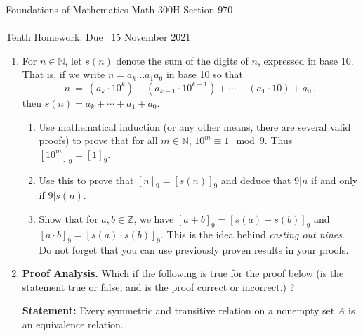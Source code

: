 \documentclass[12pt]{article}
\newcommand{\NN}{{\mathbb N}}  %
\newcommand{\ZZ}{{\mathbb Z}}  %
\newcommand{\demph}[1]{{\color{blue}\sl{#1}}}
\begin{document}
\LARGE 
\noindent
{\color{Maroon}Foundations of Mathematics \hfill Math 300H Section 970}\vspace{2pt}\\
\Large \vspace{2pt}\\
\large
Tenth Homework: \hfill Due \  15 November 2021
\normalsize\medskip


\noindent{\color{blue}\rule{528.3675pt}{2pt}}


\begin{enumerate}  %

   
\item For $n\in \NN$, let $s(n)$ denote the sum of the digits of $n$, expressed in base 10.
  That is, if we write $n=a_k\dotsc a_1 a_0$ in base 10 so that
  \[
     n\ =\ \left(a_k\cdot 10^k\right) +   \left(a_{k-1}\cdot 10^{k-1}\right) +\dotsb + 
     \left(a_1\cdot 10\right) + a_0\,,
  \]
  then $s(n)=a_k+\dotsb+a_1+a_0$.
   \begin{enumerate}
     \item Use mathematical induction (or any other means, there are several valid proofs) to prove that for all $m\in\NN$, $10^m\equiv 1\mod 9$.
     Thus $[10^m]_9=[1]_9$.

     \item Use this to prove that $[n]_9 = [s(n)]_9$ and deduce that $9|n$ if and only if $9|s(n)$.

     \item Show that for $a,b\in\ZZ$, we have $[a+ b]_9=[s(a)+ s(b)]_9$ and $[a\cdot b]_9=[s(a)\cdot s(b)]_9$.
       This is the idea behind \demph{casting out nines}.
       Do not forget that you can use previously proven results in your proofs.
   \end{enumerate}


\item {\bf Proof Analysis.}   Which if the following is true for the proof below (is the statement true or false, and is
  the proof correct or incorrect.) ?

  {\bf Statement:} Every symmetric and transitive relation on a nonempty set $A$ is an equivalence relation.


\end{enumerate}
\end{document}
